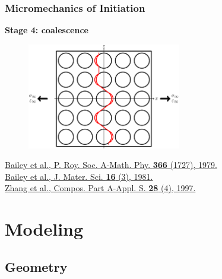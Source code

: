 \documentclass[first,firstsupp,lastsupp,last,hyperref,table]{ETHclass}
\begin{document}
\begin{frame}
\frametitle{\vspace{0.2cm}\small Micromechanics of Initiation}
\vspace{-0.5cm}
\centering
\begin{alertblock}{\centering\scriptsize\bf Stage 4: coalescence}
\vspace{-0.25cm}
\begin{figure}
\centering
\includegraphics[width=0.6\textwidth]{stage4-coalescence.pdf}
\end{figure}
\end{alertblock}
\vspace{-0.5cm}
\centering
\pgfmathsetmacro{}
\pgfmathsetmacro{}
{\centering\fontsize{\fontsizeref}{\stretchref} \selectfont \href{https://doi.org/10.1098/rspa.1979.0071}{Bailey et al., P. Roy. Soc. A-Math. Phy. \textbf{366} (1727), 1979.}}\\\vspace{-5pt}
{\centering\fontsize{\fontsizeref}{\stretchref} \selectfont \href{https://doi.org/10.1007/BF00552203}{Bailey et al., J. Mater. Sci. \textbf{16} (3), 1981.}}\\\vspace{-5pt}
{\centering\fontsize{\fontsizeref}{\stretchref} \selectfont \href{https://doi.org/10.1016/S1359-835X(96)00123-6}{Zhang et al., Compos. Part A-Appl. S. \textbf{28} (4), 1997.}}\\\vspace{1pt}
\end{frame}


\section{Modeling}

\subsection{Geometry}
\end{document}
